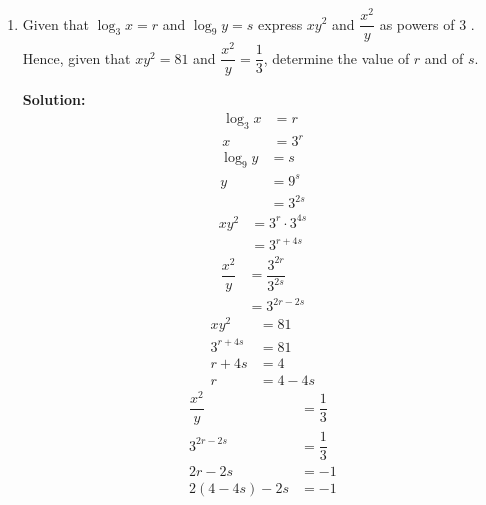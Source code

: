\documentclass{report}
\newcommand{\sol}{\vspace{0.2cm}\textbf{Solution:}\vspace{0.2cm}}
\begin{document}
\begin{multicols*}{2}
\begin{enumerate}[leftmargin=*]
\begin{enumerate}
                  \item Given that $\log _3 x=r$ and $\log _9 y=s$ express $x y^2$ and $\dfrac{x^2}{y}$
                        as powers of 3 . Hence, given that $xy^2=81$ and $\dfrac{x^2}{y}=\dfrac{1}{3}$,
                        determine the value of $r$ and of $s$.

                        \sol{}
                        \begin{align*}
                            \log_3 x & = r   \\
                            x        & = 3^r
                        \end{align*}
                        \begin{align*}
                            \log_9 y & = s      \\
                            y        & = 9^s    \\
                                     & = 3^{2s}
                        \end{align*}
                        \begin{align*}
                            x y^2 & = 3^r \cdot 3^{4s} \\
                                  & = 3^{r + 4s}
                        \end{align*}
                        \begin{align*}
                            \dfrac{x^2}{y} & = \dfrac{3^{2r}}{3^{2s}} \\
                                           & = 3^{2r - 2s}
                        \end{align*}
                        \begin{align*}
                            xy^2     & = 81     \\
                            3^{r+4s} & = 81     \\
                            r + 4s   & = 4      \\
                            r        & = 4 - 4s
                        \end{align*}
                        \begin{align*}
                            \dfrac{x^2}{y} & = \dfrac{1}{3}  \\
                            3^{2r - 2s}    & = \dfrac{1}{3}  \\
                            2r - 2s        & = -1            \\
                            2(4 - 4s) - 2s & = -1            \\

\end{align*}
\end{enumerate}
\end{enumerate}
\end{multicols*}
\end{document}
